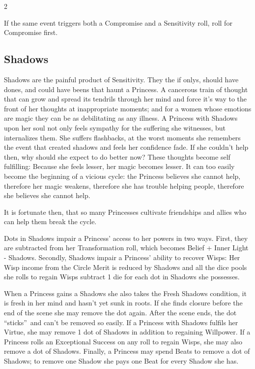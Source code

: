 \begin{multicols}{2}
\begin{mybox}
If the same event triggers both a Compromise and a Sensitivity roll, roll for Compromise first.

\end{mybox}

\subsection*{Shadows} 
\label{subsec:Shadows} 

Shadows are the painful product of Sensitivity. They the if onlys, should have dones, and could have beens that haunt a Princess. A cancerous train of thought that can grow and spread its tendrils through her mind and force it's way to the front of her thoughts at inappropriate moments; and for a women whose emotions are magic they can be as debilitating as any illness. A Princess with Shadows upon her soul not only feels sympathy for the suffering she witnesses, but internalizes them. She suffers flashbacks, at the worst moments she remembers the event that created shadows and feels her confidence fade. If she couldn’t help then, why should she expect to do better now?  These thoughts become self fulfilling: Because she feels lesser, her magic becomes lesser. It can too easily
become the beginning of a vicious cycle: the Princess believes she cannot help, therefore her magic weakens, therefore she has trouble helping people, therefore she believes she cannot help.

It is fortunate then, that so many Princesses cultivate friendships and allies who can help them break the cycle.

Dots in Shadows impair a Princess' access to her powers in two ways. First, they are subtracted from her Transformation roll, which becomes Belief + Inner Light - Shadows. Secondly, Shadows  impair a Princess' ability to recover Wisps: Her Wisp income from the Circle Merit is reduced by Shadows and all the dice pools she rolls to regain Wisps subtract 1 die for each dot in Shadows she possesses.

When a Princess gains a Shadows she also takes the Fresh Shadows condition, it is fresh in her mind and hasn't yet sunk in roots. If she finds closure before the end of the scene she may remove the dot again. After the scene ends, the dot \textquotedblleft sticks\textquotedblright\, and can't be removed so easily. If a Princess with Shadows fulfils her Virtue, she may remove 1 dot of Shadows in addition to regaining Willpower. If a Princess rolls an Exceptional Success on any roll to regain Wisps, she may also remove a dot of Shadows. Finally, a Princess may spend Beats to remove a dot of Shadows; to remove one Shadow she pays one Beat for every Shadow she has. 


\end{multicols}

